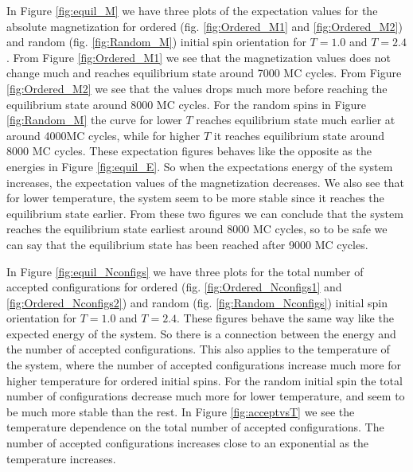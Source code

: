 \documentclass[12pt,a4paper,english]{article}
\begin{document}
In Figure \ref{fig:equil_M} we have three plots of the expectation values for the absolute magnetization for ordered (fig. \ref{fig:Ordered_M1} and \ref{fig:Ordered_M2}) and random (fig. \ref{fig:Random_M}) initial spin orientation for $T=1.0$ and $T=2.4$. From Figure \ref{fig:Ordered_M1} we see that the magnetization values does not change much and reaches equilibrium state around 7000 MC cycles. From Figure \ref{fig:Ordered_M2} we see that the values drops much more before reaching the equilibrium state around 8000 MC cycles. For the random spins in Figure \ref{fig:Random_M} the curve for lower $T$ reaches equilibrium state much earlier at around 4000MC cycles, while for higher $T$ it reaches equilibrium state around 8000 MC cycles. These expectation figures behaves like the opposite as the energies in Figure \ref{fig:equil_E}. So when the expectations energy of the system increases, the expectation values of the magnetization decreases. We also see that for lower temperature, the system seem to be more stable since it reaches the equilibrium state earlier. From these two figures we can conclude that the system reaches the equilibrium state earliest around 8000 MC cycles, so to be safe we can say that the equilibrium state has been reached after 9000 MC cycles.

In Figure \ref{fig:equil_Nconfigs} we have three plots for the total number of accepted configurations for ordered (fig. \ref{fig:Ordered_Nconfigs1} and \ref{fig:Ordered_Nconfigs2}) and random (fig. \ref{fig:Random_Nconfigs}) initial spin orientation for $T=1.0$ and $T=2.4$. These figures behave the same way like the expected energy of the system. So there is a connection between the energy and the number of accepted configurations. This also applies to the temperature of the system, where the number of accepted configurations increase much more for higher temperature for ordered initial spins. For the random initial spin the total number of configurations decrease much more for lower temperature, and seem to be much more stable than the rest. In Figure \ref{fig:acceptvsT} we see the temperature dependence on the total number of accepted configurations. The number of accepted configurations increases close to an exponential as the temperature increases.
\end{document}
